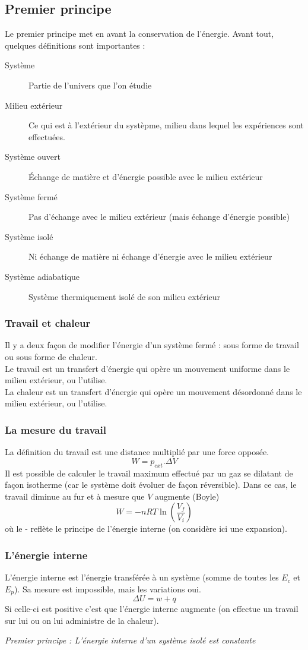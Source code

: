 \documentclass[12pt, a4paper]{article}
\begin{document}
\subsection{Premier principe}
Le premier principe met en avant la conservation de l'énergie. Avant tout, quelques définitions sont importantes : 
\begin{description}
\item[Système] Partie de l'univers que l'on étudie
\item[Milieu extérieur] Ce qui est à l'extérieur du systèpme, milieu dans lequel les expériences sont effectuées.
\item[Système ouvert] Échange de matière et d'énergie possible avec le milieu extérieur
\item[Système fermé] Pas d'échange avec le milieu extérieur (mais échange d'énergie possible)
\item[Système isolé] Ni échange de matière ni échange d'énergie avec le milieu extérieur
\item[Système adiabatique] Système thermiquement isolé de son milieu extérieur
\end{description}
\subsubsection{Travail et chaleur}
Il y a deux façon de modifier l'énergie d'un système fermé : sous forme de travail ou sous forme de chaleur.\\
Le travail est un transfert d'énergie qui opère un mouvement uniforme dans le milieu extérieur, ou l'utilise.\\
La chaleur est un transfert d'énergie qui opère un mouvement désordonné dans le milieu extérieur, ou l'utilise.

\subsubsection{La mesure du travail}
La définition du travail est une distance multiplié par une force opposée.
$$W = p_{ext}.\Delta V$$
Il est possible de calculer le travail maximum effectué par un gaz se dilatant de façon isotherme (car le système doit évoluer de façon réversible). Dans ce cas, le travail diminue au fur et à mesure que $V$ augmente (Boyle)
$$W = -nRT\ln\left(\frac{V_f}{V_i}\right)$$
où le - reflète le principe de l'énergie interne (on considère ici une expansion).

\subsubsection{L'énergie interne}
L'énergie interne est l'énergie transférée à un système (somme de toutes les $E_c$ et $E_p$). Sa mesure est impossible, mais les variations oui.
$$\Delta U = w + q$$
Si celle-ci est positive c'est que l'énergie interne augmente (on effectue un travail sur lui ou on lui administre de la chaleur).
\begin{center}
\textit{Premier principe : L'énergie interne d'un système isolé est constante}
\end{center}
\end{document}
